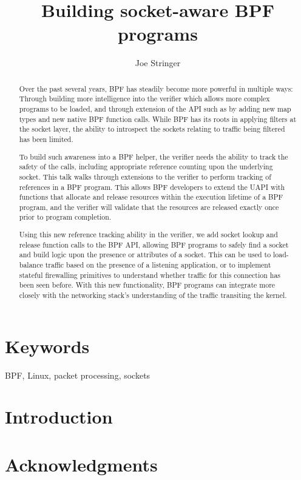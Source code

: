 \documentclass[10pt,sigconf,authorversion]{lpc}
\title{Building socket-aware BPF programs}
\author{Joe Stringer}
\affiliation{%
      \institution{Cilium.io}}
\begin{document}
\begin{abstract}

Over the past several years, BPF has steadily become more powerful in
multiple ways: Through building more intelligence into the verifier which
allows more complex programs to be loaded, and through extension of the API
such as by adding new map types and new native BPF function calls. While
BPF has its roots in applying filters at the socket layer, the ability to
introspect the sockets relating to traffic being filtered has been limited.

To build such awareness into a BPF helper, the verifier needs the ability to
track the safety of the calls, including appropriate reference counting upon
the underlying socket. This talk walks through extensions to the verifier to
perform tracking of references in a BPF program. This allows BPF developers to
extend the UAPI with functions that allocate and release resources within the
execution lifetime of a BPF program, and the verifier will validate that the
resources are released exactly once prior to program completion.

Using this new reference tracking ability in the verifier, we add socket lookup
and release function calls to the BPF API, allowing BPF programs to safely find
a socket and build logic upon the presence or attributes of a socket. This can
be used to load-balance traffic based on the presence of a listening
application, or to implement stateful firewalling primitives to understand
whether traffic for this connection has been seen before. With this new
functionality, BPF programs can integrate more closely with the networking
stack's understanding of the traffic transiting the kernel.

\end{abstract}

\maketitle

\section{Keywords}

BPF, Linux, packet processing, sockets

\section{Introduction}

\section{Acknowledgments}




\end{document}
